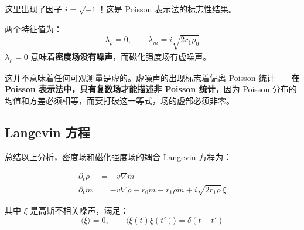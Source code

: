 这里出现了因子 $i = \sqrt{-1}$！这是 Poisson 表示法的标志性结果。

\begin{notebox}[虚噪声的物理意义]
两个特征值为：
\[
\lambda_\rho = 0, \qquad \lambda_m = i\sqrt{2r_1\rho_0}
\]
$\lambda_\rho = 0$ 意味着\textbf{密度场没有噪声}，而磁化强度场有虚噪声。

这并不意味着任何可观测量是虚的。虚噪声的出现标志着偏离 Poisson 统计——\textbf{在 Poisson 表示法中，只有复数场才能描述非 Poisson 统计}，因为 Poisson 分布的均值和方差必须相等，而要打破这一等式，场的虚部必须非零。
\end{notebox}

\subsection{Langevin 方程}\label{subsec:langevin}

总结以上分析，密度场和磁化强度场的耦合 Langevin 方程为：

\begin{eqbox}
\begin{align}
\partial_t \tilde{\rho} &= -v\nabla\tilde{m} \label{eq:langevin-rho}\\
\partial_t \tilde{m} &= -v\nabla\tilde{\rho} - r_0\tilde{m} - r_1\tilde{\rho}\tilde{m} + i\sqrt{2r_1\tilde{\rho}}\,\xi \label{eq:langevin-m}
\end{align}
\end{eqbox}

其中 $\xi$ 是高斯不相关噪声，满足：
\begin{equation}\label{eq:noise-correlation}
\langle \xi \rangle = 0, \qquad \langle \xi(t)\xi(t') \rangle = \delta(t - t')
\end{equation}


